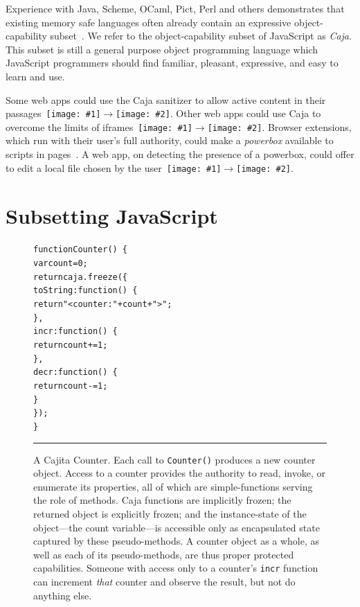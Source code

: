 \documentclass[letterpaper,twocolumn,10pt]{article}
\newcommand{\qq}[2]{{\texttt{[image: \#1]}}$\rightarrow${\texttt{[image: \#2]}}}
\newcommand{\code}[1]{{\tt {#1}}}              %
\begin{document}
Experience with Java, Scheme, OCaml, Pict, Perl and others demonstrates that 
existing memory safe languages often already contain an expressive 
object-capability subset~\cite[respectively]{joe-e, rees96security, emily, 
backwater, caperl}. We refer to the object-capability subset of JavaScript as 
\emph{Caja}. This subset is still a general purpose object programming 
language which JavaScript programmers should find familiar, pleasant, 
expressive, and easy to learn and use. 

Some web apps could use the Caja sanitizer to allow active content in their 
passages~\qq{1}{5}. Other web apps could use Caja to overcome the limits of 
iframes~\qq{3}{5}. Browser extensions, which run with their user's full 
authority, could make a \emph{powerbox} available to scripts in 
pages~\cite{darpareview, stiegler:polaris, seaborn:plash, bitfrost}. A web 
app, on detecting the presence of a powerbox, could offer to edit a local 
file chosen by the user~\qq{4}{6}.

\section{Subsetting JavaScript}
\label{sec:subset}

\begin{figure}[t!]
\begin{alltt}
function Counter()\ \{
  var count = 0;
  return caja.freeze(\{
    toString: function()\ \{ 
      return "<counter: " + count + ">"; 
    \},
    incr: function()\ \{ 
      return count += 1; 
    \},
    decr: function()\ \{ 
      return count -= 1; 
    \}
  \});
\}
\end{alltt}

\caption[A Cajita Counter.]{A Cajita Counter. Each call to \code{Counter()} 
produces a new counter object. Access to a counter provides the authority to 
read, invoke, or enumerate its properties, all of which are simple-functions 
serving the role of methods. Caja functions are implicitly frozen; the 
returned object is explicitly frozen; and the instance-state of the 
object---the count variable---is accessible only as encapsulated state 
captured by these pseudo-methods. A counter object as a whole, as well as 
each of its pseudo-methods, are thus proper protected capabilities. Someone 
with access only to a counter's \code{incr} function can increment 
\emph{that} counter and observe the result, but not do anything else.
 \\ } \hrule
\label{fig:cajita-counter}
\end{figure}
\end{document}
